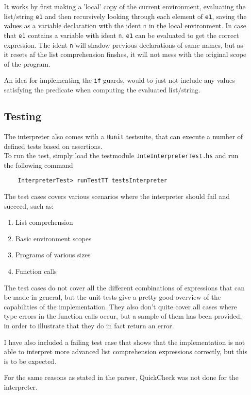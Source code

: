 \documentclass[a4paper]{article}
\begin{document}
It works by first making a 'local' copy of the current environment, evaluating the list/string \texttt{e1} and then recursively looking through each element of \texttt{e1}, saving the values as a variable declaration with the ident \texttt{n} in the local environment. In case that \texttt{e1} contains a variable with ident \texttt{n}, \texttt{e1} can be evaluated to get the correct expression. The ident \texttt{n} will shadow previous declarations of same names, but as it resets af the list
comprehension finshes, it will not mess with the original scope of the program.

An idea for implementing the \texttt{if} guards, would to just not include any values satisfying the predicate when computing the evaluated list/string.
\subsection{Testing}
\label{sub:Testing_i}
The interpreter also comes with a \texttt{Hunit} testsuite, that can execute a number of defined tests based on assertions.\\
To run the test, simply load the testmodule \texttt{InteInterpreterTest.hs} and run the following command
\begin{verbatim}
    InterpreterTest> runTestTT testsInterpreter
\end{verbatim}
The test cases covers various scenarios where the interpreter should fail and succeed, such as:
\begin{enumerate}
  \item List comprehension
  \item Basic environment scopes
  \item Programs of various sizes
  \item Function calls
\end{enumerate}
The test cases do not cover all the different combinations of expressions that can be made in general, but the unit tests give a pretty good overview of the capabilities of the implementation. They also don't quite cover all cases where type errors in the function calls occur, but a sample of them has been provided, in order to illustrate that they do in fact return an error.

I have also included a failing test case that shows that the implementation is not able to interpret more advanced list comprehension expressions correctly, but this is to be expected.

For the same reasons as stated in the parser, QuickCheck was not done for the interpreter.
\end{document}
